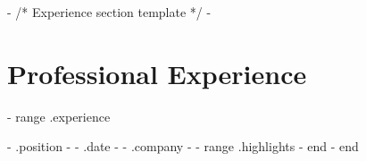 {{- /* Experience section template */ -}}
\section{Professional Experience}
  \resumeSubHeadingListStart
{{- range .experience}}

    \resumeSubheading
      { {{- .position -}} }{ {{- .date -}} }
      { {{- .company -}} }{}
      \resumeItemListStart
{{- range .highlights}}
{{- end}}
      \resumeItemListEnd
{{- end}}

  \resumeSubHeadingListEnd
